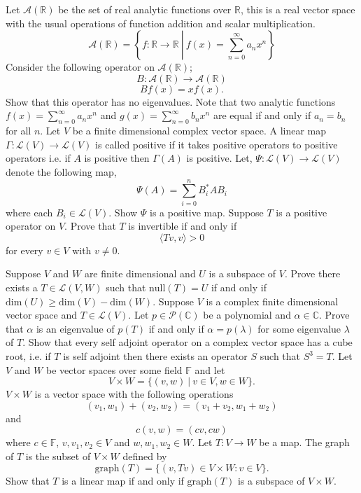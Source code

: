 \documentclass[11pt]{exam}
\theoremstyle{definition}
\begin{document}
\begin{questions}
\question Let $\mathcal{A}(\mathbb{R})$ be the set of real analytic functions over $\mathbb{R}$, this is a real vector space with the usual operations of function addition and scalar multiplication.  
\[\mathcal{A}(\mathbb{R})=\left\{f:\mathbb{R}\rightarrow \mathbb{R} \ \left|\  f(x)=\sum_{n=0}^\infty a_nx^n\right.\right\}\]
Consider the following operator on $\mathcal{A}(\mathbb{R})$; 
\[B:\mathcal{A}(\mathbb{R})\rightarrow \mathcal{A}(\mathbb{R})\]
\[Bf(x)=xf(x).\]
Show that this operator has no eigenvalues. Note that two analytic functions $f(x)=\sum_{n=0}^\infty a_nx^n$ and $g(x)=\sum_{n=0}^\infty b_nx^n$ are equal if and only if $a_n=b_n$ for all $n$. 
\vfill
\question Let $V$ be a finite dimensional complex vector space.  A linear map $\Gamma:\mathcal{L}(V)\rightarrow \mathcal{L}(V)$ is called positive if it takes positive operators to positive operators i.e. if $A$ is positive then $\Gamma(A)$ is positive. Let, $\Psi:\mathcal{L}(V)\rightarrow \mathcal{L}(V)$ denote the following map, 
\[\Psi(A)=\sum_{i=0}^n B_i^* A B_i\]
where each $B_i\in \mathcal{L}(V)$. Show $\Psi$ is a positive map. 
\vfill
\question Suppose $T$ is a positive operator on $V$. Prove that $T$ is invertible if and only if 
\[\langle Tv,v\rangle >0 \]
for every $v\in V$ with $v\neq 0$. 
\vfill
\item Suppose $V$ and $W$ are finite dimensional and $U$ is a subspace of $V$. Prove there exists a $T\in \mathcal{L}(V,W)$ such that $\text{null}(T)=U$ if and only if $\text{dim}(U)\geq \text{dim}(V)-\text{dim}(W)$.
\vfill
\question Suppose $V$ is a complex finite dimensional vector space and $T\in \mathcal{L}(V)$. Let $p\in \mathcal{P}(\mathbb{C})$ be a polynomial and $\alpha\in \mathbb{C}$. Prove that $\alpha$ is an eigenvalue of $p(T)$ if and only if $\alpha=p(\lambda)$ for some eigenvalue $\lambda$ of $T$.
\vfill
\question Show that every self adjoint operator on a complex vector space has a cube root, i.e. if $T$ is self adjoint then there exists an operator $S$ such that $S^3=T$. 
\vfill
\question Let $V$ and $W$ be vector spaces over some field $\mathbb{F}$ and let
\[V\times W=\{(v,w)\ |\ v\in V, w\in W\}.\]
$V\times W$ is a vector space with the following operations 
\[(v_1,w_1)+(v_2, w_2)=(v_1+v_2, w_1 +w_2)\]
and 
\[c(v,w)=(cv, cw)\]
where $c\in \mathbb{F}$, $v, v_1, v_2\in V$ and $w, w_1, w_2\in W$. 
Let $T:V\rightarrow W$ be a map. The graph of $T$ is the subset of $V\times W$ defined by 
\[\text{graph}(T)=\{(v,Tv)\in V\times W : v\in V\}.\] Show that $T$ is a linear map if and only if $\text{graph}(T)$ is a subspace of $V\times W$. 

\end{questions}
\end{document}
